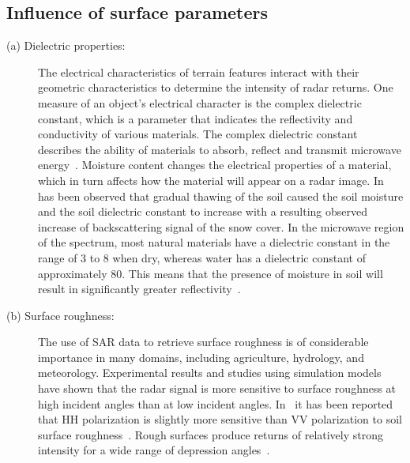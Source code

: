 \subsection{Influence of surface parameters} 
\begin{description}
	\item[(a) Dielectric properties:] The electrical characteristics of terrain features interact with their geometric characteristics to determine the intensity of radar returns. One measure of an object’s electrical character is the complex dielectric constant, which is a parameter that indicates the reflectivity and conductivity of various materials. The complex dielectric constant describes the ability of materials to absorb, reflect and transmit microwave energy~\citep{Campbell2002A}. Moisture content changes the electrical properties of a material, which in turn affects how the material will appear on a radar image. In~\citep{bernier1998potential} has been observed that gradual thawing of the soil caused the soil moisture and the soil dielectric constant to increase  with a resulting observed increase of backscattering signal of the snow cover. In the microwave region of the spectrum, most natural materials have a dielectric constant in the range of 3 to 8 when dry, whereas water has a dielectric constant of approximately 80. This means that the presence of moisture in soil will result in significantly greater reflectivity~\citep{ulaby1986microwave}.
\end{description}
\begin{description}
	\item[(b) Surface roughness:] The use of SAR data to retrieve surface roughness is of considerable importance in many domains, including agriculture, hydrology, and meteorology. Experimental results and studies using simulation models have shown that the radar signal is more sensitive to surface roughness at high incident angles than at low incident angles. In~\citep{holah2005potential,baghdadi2002potential,fung1994microwave,ulaby1986microwave} it has been reported that HH polarization is slightly more sensitive than VV polarization to soil surface roughness~\citep{holah2005potential}. Rough surfaces produce returns of relatively strong intensity for a wide range of depression angles~\citep{li1983tradeoffs}.
\end{description}

